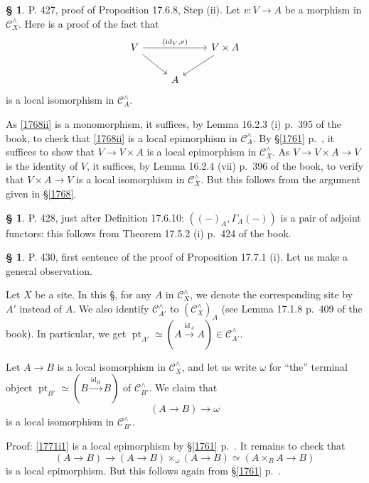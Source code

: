 \documentclass[12pt]{article}%
\theoremstyle{remark}
\theoremstyle{definition}
\newtheorem{s}[thm]{\S}%
\newcommand{\oo}{\operatorname}
\newcommand{\C}{\mathcal C}
\newcommand{\xr}{\xrightarrow}
\DeclareMathOperator{\id}{id}
\begin{document}
\begin{s}
P. 427, proof of Proposition 17.6.8, Step (ii). Let $v:V\to A$ be a morphism in $\C_X^\wedge$. Here is a proof of the fact that 
\begin{equation}\label{1768ii}
\begin{tikzcd} 
V\ar{rr}{(\id_V,v)}\ar{dr}&&V\times A\ar{dl}\\ 
{}&A
\end{tikzcd}
\end{equation} 
is a local isomorphism in $\C_A^\wedge$. 

As \eqref{1768ii} is a monomorphism, it suffices, by Lemma 16.2.3 (i) p.~395 of the book, to check that \eqref{1768ii} is a local epimorphism in $\C_A^\wedge$. By \S\ref{1761} p.~\pageref{1761}, it suffices to show that $V\to V\times A$ is a local epimorphism in $\C_X^\wedge$. As $V\to V\times A\to V$ is the identity of $V$, it suffices, by Lemma 16.2.4 (vii) p.~396 of the book, to verify that $V\times A\to V$ is a local isomorphism in $\C_X^\wedge$. But this follows from the argument given in \S\ref{1768}.
\end{s} 

%

\begin{s}\label{a428}
P. 428, just after Definition 17.6.10: $((-)_A,\Gamma_A(-))$ is a pair of adjoint functors: this follows from Theorem 17.5.2 (i) p.~424 of the book.
\end{s} 

%

\begin{s}%
P. 430, first sentence of the proof of Proposition 17.7.1 (i). Let us make a general observation. 

Let $X$ be a site. In this \S, for any $A$ in $\C_X^\wedge$, we denote the corresponding site by $A'$ instead of $A$. We also identify $\C_{A'}^\wedge$ to $(\C_X^\wedge)_A$ (see Lemma 17.1.8 p.~409 of the book). In particular, we get $\oo{pt}_{A'}\simeq(A\xr{\id_A}A)\in\C_{A'}^\wedge$. 

Let $A\to B$ is a local isomorphism in $\C_X^\wedge$, and let us write $\omega$ for ``the'' terminal object $\oo{pt}_{B'}\simeq(B\xr{\id_B}B)$ of $\C_{B'}^\wedge$. We claim that 
\begin{equation}\label{1771i1}
(A\to B)\to\omega 
\end{equation} 
is a local isomorphism in $\C_{B'}^\wedge$.

Proof: \eqref{1771i1} is a local epimorphism by \S\ref{1761} p.~\pageref{1761}. It remains to check that 
\begin{equation}\label{1771i2}
(A\to B)\to(A\to B)\times_\omega(A\to B)\simeq(A\times_BA\to B)
\end{equation} 
is a local epimorphism. But this follows again from \S\ref{1761} p.~\pageref{1761}. 
\end{s} 
\end{document}
